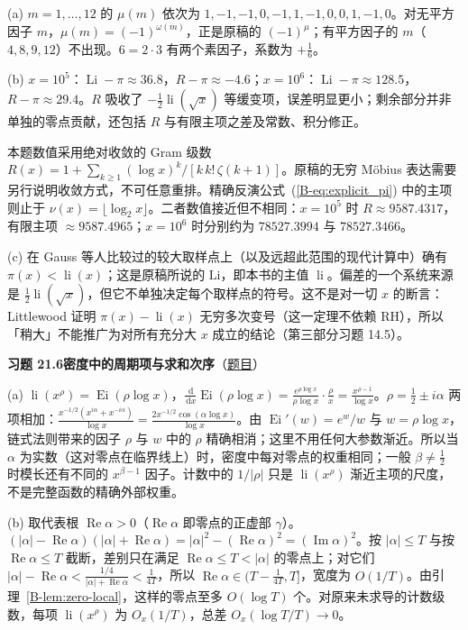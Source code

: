 \documentclass[11pt,a4paper]{article}
\DeclareMathOperator{\Li}{Li}
\DeclareMathOperator{\li}{li}
\DeclareMathOperator{\Ei}{Ei}
\newcommand{\dd}{\,\mathrm{d}}
\renewcommand{\Re}{\operatorname{Re}}
\renewcommand{\Im}{\operatorname{Im}}
\newcommand{\bref}[1]{\ref*{B-#1}}
\newcommand{\Sol}[2]{%
  \par\addvspace{1.2em}\noindent
  \hypertarget{s:#1}{}\textbf{习题 #1\quad #2}\hfill{\small（\hyperlink{q:#1}{题目}）}\par
  \nopagebreak\smallskip}
\begin{document}
(a) $m=1,\dots,12$ 的 $\mu(m)$ 依次为 $1,-1,-1,0,-1,1,-1,0,0,1,-1,0$。对无平方因子 $m$，$\mu(m)=(-1)^{\omega(m)}$，正是原稿的 $(-1)^\mu$；有平方因子的 $m$（$4,8,9,12$）不出现。$6=2\cdot3$ 有两个素因子，系数为 $+\frac16$。

(b) $x=10^5$：$\Li-\pi\approx36.8$，$R-\pi\approx-4.6$；$x=10^6$：$\Li-\pi\approx128.5$，$R-\pi\approx29.4$。$R$ 吸收了 $-\frac12\li(\sqrt x)$ 等缓变项，误差明显更小；剩余部分并非单独的零点贡献，还包括 $R$ 与有限主项之差及常数、积分修正。

本题数值采用绝对收敛的 Gram 级数 $R(x)=1+\sum_{k\ge1}(\log x)^k/[k\,k!\,\zeta(k+1)]$。原稿的无穷 Möbius 表达需要另行说明收敛方式，不可任意重排。精确反演公式~(\bref{eq:explicit_pi}) 中的主项则止于 $\nu(x)=\lfloor\log_2x\rfloor$。二者数值接近但不相同：$x=10^5$ 时 $R\approx9587.4317$，有限主项 $\approx9587.4965$；$x=10^6$ 时分别约为 $78527.3994$ 与 $78527.3466$。

(c) 在 Gauss 等人比较过的较大取样点上（以及远超此范围的现代计算中）确有 $\pi(x)<\li(x)$；这是原稿所说的 $\mathrm{Li}$，即本书的主值 $\li$。偏差的一个系统来源是 $\frac12\li(\sqrt x)$，但它不单独决定每个取样点的符号。这不是对一切 $x$ 的断言：Littlewood 证明 $\pi(x)-\li(x)$ 无穷多次变号（这一定理不依赖 RH），所以「稍大」不能推广为对所有充分大 $x$ 成立的结论（第三部分习题 14.5）。

\Sol{21.6}{密度中的周期项与求和次序}
(a) $\li(x^\rho)=\Ei(\rho\log x)$，$\frac{\dd}{\dd x}\Ei(\rho\log x)=\frac{e^{\rho\log x}}{\rho\log x}\cdot\frac\rho x=\frac{x^{\rho-1}}{\log x}$。$\rho=\frac12\pm i\alpha$ 两项相加：$\frac{x^{-1/2}(x^{i\alpha}+x^{-i\alpha})}{\log x}=\frac{2x^{-1/2}\cos(\alpha\log x)}{\log x}$。由 $\Ei'(w)=e^w/w$ 与 $w=\rho\log x$，链式法则带来的因子 $\rho$ 与 $w$ 中的 $\rho$ 精确相消；这里不用任何大参数渐近。所以当 $\alpha$ 为实数（这对零点在临界线上）时，密度中每对零点的权重相同；一般 $\beta\ne\frac12$ 时模长还有不同的 $x^{\beta-1}$ 因子。计数中的 $1/|\rho|$ 只是 $\li(x^\rho)$ 渐近主项的尺度，不是完整函数的精确外部权重。

(b) 取代表根 $\Re\alpha>0$（$\Re\alpha$ 即零点的正虚部 $\gamma$）。$(|\alpha|-\Re\alpha)(|\alpha|+\Re\alpha)=|\alpha|^2-(\Re\alpha)^2=(\Im\alpha)^2$。按 $|\alpha|\le T$ 与按 $\Re\alpha\le T$ 截断，差别只在满足 $\Re\alpha\le T<|\alpha|$ 的零点上；对它们 $|\alpha|-\Re\alpha<\frac{1/4}{|\alpha|+\Re\alpha}<\frac1{4T}$，所以 $\Re\alpha\in(T-\frac1{4T},T]$，宽度为 $O(1/T)$。由引理~\bref{lem:zero-local}，这样的零点至多 $O(\log T)$ 个。对原来未求导的计数级数，每项 $\li(x^\rho)$ 为 $O_x(1/T)$，总差 $O_x(\log T/T)\to0$。
\end{document}
